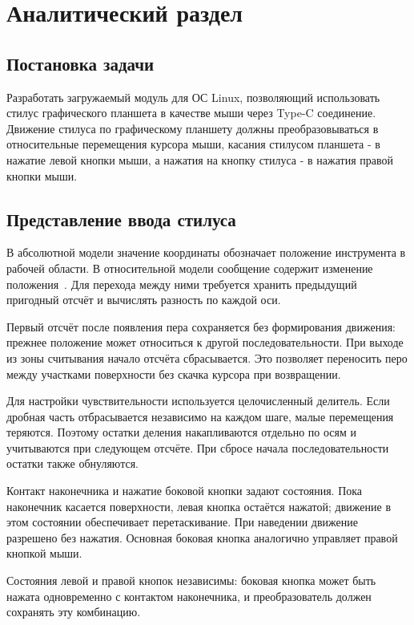 \chapter{Аналитический раздел}

\section{Постановка задачи}

Разработать загружаемый модуль для ОС Linux, позволяющий использовать стилус графического планшета в качестве мыши через Type-C соединение. Движение стилуса по графическому планшету должны преобразовываться в относительные перемещения курсора мыши, касания стилусом планшета - в нажатие левой кнопки мыши, а нажатия на кнопку стилуса - в нажатия правой кнопки мыши.

\section{Представление ввода стилуса}

В абсолютной модели значение координаты обозначает положение инструмента в рабочей области. В относительной модели сообщение содержит изменение положения~\cite{kernelinput}. Для перехода между ними требуется хранить предыдущий пригодный отсчёт и вычислять разность по каждой оси.

Первый отсчёт после появления пера сохраняется без формирования движения: прежнее положение может относиться к другой последовательности. При выходе из зоны считывания начало отсчёта сбрасывается. Это позволяет переносить перо между участками поверхности без скачка курсора при возвращении.

Для настройки чувствительности используется целочисленный делитель. Если дробная часть отбрасывается независимо на каждом шаге, малые перемещения теряются. Поэтому остатки деления накапливаются отдельно по осям и учитываются при следующем отсчёте. При сбросе начала последовательности остатки также обнуляются.

Контакт наконечника и нажатие боковой кнопки задают состояния. Пока наконечник касается поверхности, левая кнопка остаётся нажатой; движение в этом состоянии обеспечивает перетаскивание. При наведении движение разрешено без нажатия. Основная боковая кнопка аналогично управляет правой кнопкой мыши.

Состояния левой и правой кнопок независимы: боковая кнопка может быть нажата одновременно с контактом наконечника, и преобразователь должен сохранять эту комбинацию.


